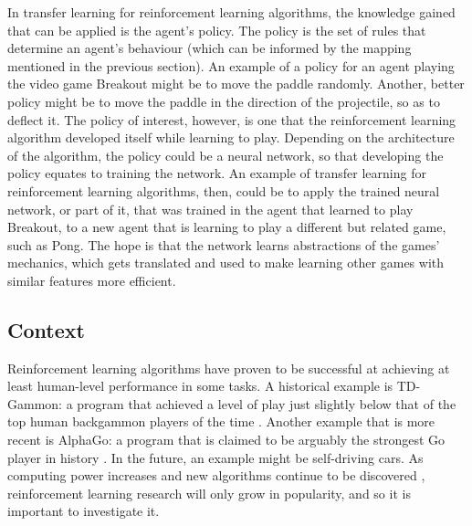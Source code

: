 \documentclass[12pt,a4paper]{article}
\begin{document}
In transfer learning for reinforcement learning algorithms, the knowledge gained that can be applied is the agent's policy. The policy is the set of rules that determine an agent's behaviour (which can be informed by the mapping mentioned in the previous section). An example of a policy for an agent playing the video game Breakout might be to move the paddle randomly. Another, better policy might be to move the paddle in the direction of the projectile, so as to deflect it. The policy of interest, however, is one that the reinforcement learning algorithm developed itself while learning to play. Depending on the architecture of the algorithm, the policy could be a neural network, so that developing the policy equates to training the network. An example of transfer learning for reinforcement learning algorithms, then, could be to apply the trained neural network, or part of it, that was trained in the agent that learned to play Breakout, to a new agent that is learning to play a different but related game, such as Pong. The hope is that the network learns abstractions of the games' mechanics, which gets translated and used to make learning other games with similar features more efficient.

\subsection{Context}
Reinforcement learning algorithms have proven to be successful at achieving at least human-level performance in some tasks. A historical example is TD-Gammon: a program that achieved a level of play just slightly below that of the top human backgammon players of the time \cite{}. Another example that is more recent is AlphaGo: a program that is claimed to be arguably the strongest Go player in history \cite{}. In the future, an example might be self-driving cars. As computing power increases and new algorithms continue to be discovered \cite{}, reinforcement learning research will only grow in popularity, and so it is important to investigate it.
\end{document}
